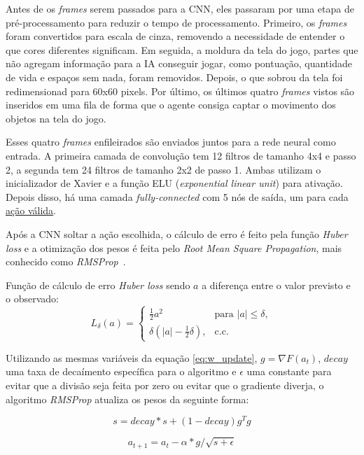 Antes de os \textit{frames} serem passados para a CNN, eles passaram por uma etapa de pré-processamento para reduzir o tempo de processamento.
Primeiro, os \textit{frames} foram convertidos para escala de cinza, removendo a necessidade de entender o que cores diferentes significam.
Em seguida, a moldura da tela do jogo, partes que não agregam informação para a IA conseguir jogar, como pontuação, quantidade de vida e espaços sem nada, foram removidos.
Depois, o que sobrou da tela foi redimensionad para 60x60 pixels.
Por último, os últimos quatro \textit{frames} vistos são inseridos em uma fila de forma que o agente consiga captar o movimento dos objetos na tela do jogo.

Esses quatro \textit{frames} enfileirados são enviados juntos para a rede neural como entrada.
A primeira camada de convolução tem 12 filtros de tamanho 4x4 e passo 2, a segunda tem 24 filtros de tamanho 2x2 de passo 1.
Ambas utilizam o inicializador de Xavier e a função ELU (\textit{exponential linear unit}) para ativação.
Depois disso, há uma camada \textit{fully-connected} com 5 nós de saída, um para cada \hyperref[sec:asteroids]{ação válida}.

Após a CNN soltar a ação escolhida, o cálculo de erro é feito pela função \textit{Huber loss} e a otimização dos pesos é feita pelo \textit{Root Mean Square Propagation}, mais conhecido como \textit{RMSProp}~\cite{rmsprop}.

Função de cálculo de erro \textit{Huber loss} sendo $a$ a diferença entre o valor previsto e o observado:
\begin{equation} \label{eq:huber}
L_{\delta}(a) = 
\begin{cases}
\frac{1}{2}a^{2} & \text{para } |a| \leq \delta,\\
\delta(|a| - \frac{1}{2}\delta), & \text{c.c.}
\end{cases}
\end{equation}

Utilizando as mesmas variáveis da equação \ref{eq:w_update}, $g = \nabla F(a_{t})$, $decay$ uma taxa de decaímento específica para o algoritmo e $\epsilon$ uma constante para evitar que a divisão seja feita por zero ou evitar que o gradiente diverja, o algoritmo \textit{RMSProp} atualiza os pesos da seguinte forma:

\begin{equation} \label{eq:gradSum}
s = decay * s + (1 - decay)g^{T}g
\end{equation}

\begin{equation} \label{eq:rmsprop}
a_{t+1} = a_{t} - \alpha * g / \sqrt{s+\epsilon}
\end{equation}

